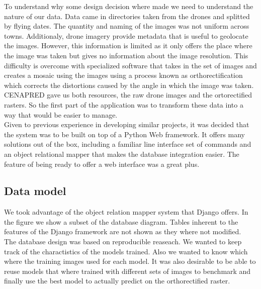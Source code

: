 To understand why some design decision where made we need to understand the nature of our data. Data came in directories taken from the drones and splitted by flying dates. The quantity and naming of the images was not uniform across towns. Additionaly, drone imagery provide metadata that is useful to geolocate the images. However, this information is limited as it only offers the place where the image was taken but gives no information about the image resolution. This difficulty is overcome with specialized software that takes in the set of images and creates a mosaic using the images using a process known as orthorectification which corrects the distortions caused by the angle in which the image was taken. CENAPRED gave us both resources, the raw drone images and the ortorectified rasters. So the first part of the application was to transform these data into a way that would be easier to manage.\\

Given to previous experience in developing similar projects, it was decided that the system was to be built on top of a Python Web framework. It offers many solutions out of the box, including a familiar line interface set of commands and an object relational mapper that makes the database integration easier. The feature of being ready to offer a web interface was a great plus.\\

\subsection{Data model}

We took advantage of the object relation mapper system that Django offers. In the figure \cite{fig:database} we show a subset of the database diagram. Tables inherent to the features of the Django framework are not shown as they where not modified.\\

The database design was based on reproducible reaseach. We wanted to keep track of the charactistics of the models trained. Also we wanted to know which where the training images used for each model. It was also desirable to be able to reuse models that where trained with different sets of images to benchmark and finally use the best model to actually predict on the orthorectified raster.\\




